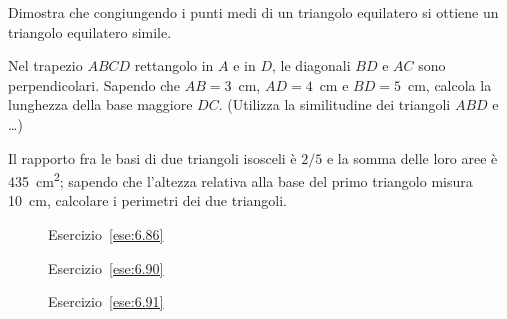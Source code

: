 \begin{multicols}{2}
\begin{esercizio}
\label{ese:6.83}
Dimostra che congiungendo i punti medi di un triangolo equilatero si ottiene un triangolo equilatero simile.
\end{esercizio}

\begin{esercizio}
\label{ese:6.84}
Nel trapezio $ABCD$ rettangolo in $A$ e in $D$, le diagonali $BD$ e $AC$ sono perpendicolari. Sapendo che $AB=3$~cm, $AD=4$~cm e $BD=5$~cm, calcola la lunghezza della base maggiore $DC$. (Utilizza la similitudine dei triangoli $ABD$ e \ldots{})
\end{esercizio}

\begin{esercizio}
\label{ese:6.85}
Il rapporto fra le basi di due triangoli isosceli è $2/5$ e la somma delle loro aree è 435~cm\textsuperscript{2}; sapendo che l'altezza relativa alla base del primo triangolo misura 10~cm, calcolare i perimetri dei due triangoli. 
\end{esercizio}

\end{multicols}

\begin{figure}[htb]
	\centering
	\caption{Esercizio~\ref{ese:6.86}}\label{fig:ese6.86}
\end{figure}

\begin{figure}[htb]
	\begin{minipage}[b]{.5\textwidth}
	\centering
	\caption{Esercizio~\ref{ese:6.90}}\label{fig:ese6.90}
	\end{minipage}
	\begin{minipage}[b]{.5\textwidth}
	\centering
	\caption{Esercizio~\ref{ese:6.91}}\label{fig:ese6.91}
	\end{minipage}
\end{figure}

